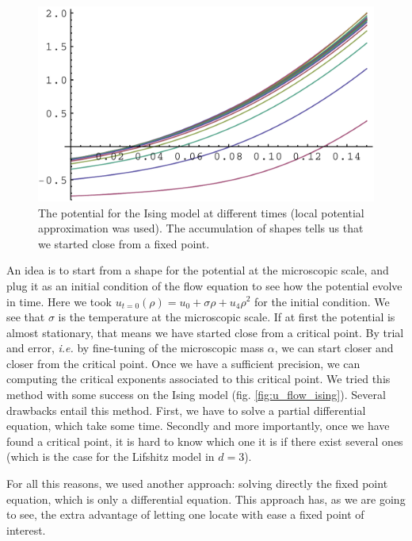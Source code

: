 \begin{figure}[htp]
\begin{center}
\includegraphics[scale=0.6]{img/chap4/u_flow_ising.pdf}
\caption{The potential for the Ising model at different times (local potential approximation was used). The accumulation of shapes tells us that we started close from a fixed point.}
\label{fig:u_flow_ising}
\end{center}
\end{figure}

An idea is to start from a shape for the potential at the microscopic scale, and plug it as an initial condition of the flow equation to see how the potential evolve in time. Here we took $u_{t=0}(\rho) = u_0 + \sigma \rho + u_4 \rho^2$ for the initial condition. We see that $\sigma$ is the temperature at the microscopic scale.
If at first the potential is almost stationary, that means we have started close from a critical point. By trial and error, \textit{i.e.} by fine-tuning of the microscopic mass $\alpha$, we can start closer and closer from the critical point. Once we have a sufficient precision, we can computing the critical exponents associated to this critical point. We tried this method with some success on the Ising model (fig. \eqref{fig:u_flow_ising}).
Several drawbacks entail this method. First, we have to solve a partial differential equation, which take some time. Secondly and more importantly, once we have found a critical point, it is hard to know which one it is if there exist several ones (which is the case for the Lifshitz model in $d = 3$).

For all this reasons, we used another approach: solving directly the fixed point equation, which is only a differential equation. This approach has, as we are going to see, the extra advantage of letting one locate with ease a fixed point of interest.

